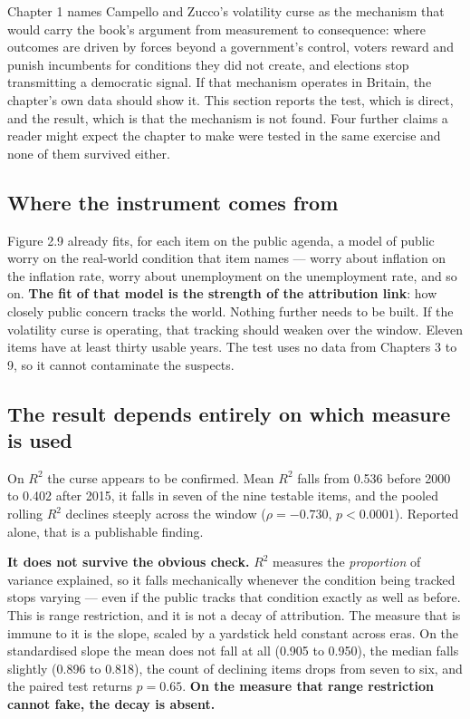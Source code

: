 Chapter 1 names Campello and Zucco's volatility curse as the mechanism that would carry the book's
argument from measurement to consequence: where outcomes are driven by forces beyond a government's
control, voters reward and punish incumbents for conditions they did not create, and elections stop
transmitting a democratic signal. If that mechanism operates in Britain, the chapter's own data
should show it. This section reports the test, which is direct, and the result, which is that the
mechanism is not found. Four further claims a reader might expect the chapter to make were tested
in the same exercise and none of them survived either.

\subsection*{Where the instrument comes from}

Figure 2.9 already fits, for each item on the public agenda, a model of public worry on the
real-world condition that item names --- worry about inflation on the inflation rate, worry about
unemployment on the unemployment rate, and so on. \textbf{The fit of that model is the strength of
the attribution link}: how closely public concern tracks the world. Nothing further needs to be
built. If the volatility curse is operating, that tracking should weaken over the window. Eleven
items have at least thirty usable years. The test uses no data from Chapters 3 to 9, so it cannot
contaminate the suspects.

\subsection*{The result depends entirely on which measure is used}



On $R^2$ the curse appears to be confirmed. Mean $R^2$ falls from 0.536 before 2000 to 0.402 after
2015, it falls in seven of the nine testable items, and the pooled rolling $R^2$ declines steeply
across the window ($\rho=-0.730$, $p<0.0001$). Reported alone, that is a publishable finding.

\textbf{It does not survive the obvious check.} $R^2$ measures the \emph{proportion} of variance
explained, so it falls mechanically whenever the condition being tracked stops varying --- even if
the public tracks that condition exactly as well as before. This is range restriction, and it is not
a decay of attribution. The measure that is immune to it is the slope, scaled by a yardstick held
constant across eras. On the standardised slope the mean does not fall at all (0.905 to 0.950), the
median falls slightly (0.896 to 0.818), the count of declining items drops from seven to six, and
the paired test returns $p=0.65$. \textbf{On the measure that range restriction cannot fake, the
decay is absent.}

